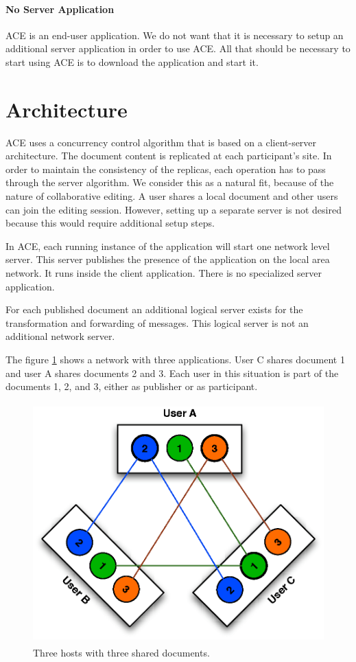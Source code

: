 \documentclass[11pt,a4paper]{article}
\begin{document}
\paragraph{No Server Application}
ACE is an end-user application. We do not want that it is necessary to setup
an additional server application in order to use ACE. All that should be
necessary to start using ACE is to download the application and start it.


\section{Architecture}

ACE uses a concurrency control algorithm that is based on a client-server 
architecture. The document content is replicated at each participant's
site. In order to maintain the consistency of the replicas, each operation 
has to pass through the server algorithm. We consider this as a natural
fit, because of the nature of collaborative editing. A user shares a 
local document and other users can join the editing session. However, setting
up a separate server is not desired because this would require additional 
setup steps.

In ACE, each running instance of the application will start one network level
server. This server publishes the presence of the application on the local
area network. It runs inside the client application. There is no specialized 
server application.

For each published document an additional logical server exists for the 
transformation and forwarding of messages. This logical server is not an 
additional network server.

The figure \ref{fig:collaboration} shows a network with three applications. 
User C shares document 1 and user A shares documents 2 and 3. Each user
in this situation is part of the documents 1, 2, and 3, either as publisher
or as participant.

\begin{figure}[H]
 \centering
 \includegraphics[width=11.57cm,height=9.24cm]{../images/collaboration.eps}
 \caption{Three hosts with three shared documents.}
 \label{fig:collaboration}
\end{figure}
\end{document}
